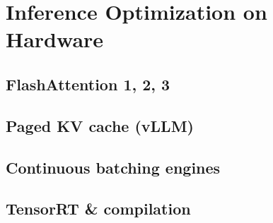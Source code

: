 
\section{Inference Optimization on Hardware}

\subsection{FlashAttention 1, 2, 3}


\subsection{Paged KV cache (vLLM)}


\subsection{Continuous batching engines}


\subsection{TensorRT \& compilation}


